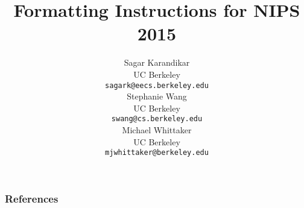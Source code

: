 \documentclass{article}
\title{Formatting Instructions for NIPS 2015}
\author{
  Sagar Karandikar \\
  UC Berkeley\\
  \texttt{sagark@eecs.berkeley.edu} \\
  \And
  Stephanie Wang \\
  UC Berkeley\\
  \texttt{swang@cs.berkeley.edu} \\
  \And
  Michael Whittaker \\
  UC Berkeley \\
  \texttt{mjwhittaker@berkeley.edu} \\
}
\begin{document}
\maketitle

{}
{}
{}
{}
{}
{}
{}

\subsubsection*{References}


\end{document}
